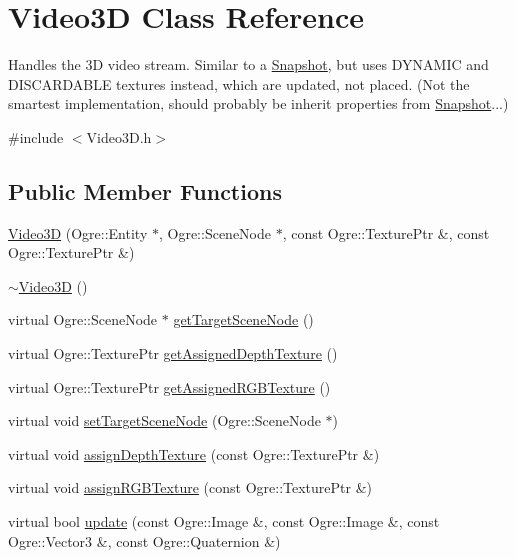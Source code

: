 \hypertarget{classVideo3D}{\section{\-Video3\-D \-Class \-Reference}
\label{classVideo3D}
}


\-Handles the 3\-D video stream. \-Similar to a \hyperlink{classSnapshot}{\-Snapshot}, but uses \-D\-Y\-N\-A\-M\-I\-C and \-D\-I\-S\-C\-A\-R\-D\-A\-B\-L\-E textures instead, which are updated, not placed. (\-Not the smartest implementation, should probably be inherit properties from \hyperlink{classSnapshot}{\-Snapshot}...)  




{\ttfamily \#include $<$\-Video3\-D.\-h$>$}

\subsection*{\-Public \-Member \-Functions}
\begin{DoxyCompactItemize}
\item 
\hyperlink{classVideo3D_aad8f80b8d60351bb34955a19c3f36d9b}{\-Video3\-D} (\-Ogre\-::\-Entity $\ast$, \-Ogre\-::\-Scene\-Node $\ast$, const \-Ogre\-::\-Texture\-Ptr \&, const \-Ogre\-::\-Texture\-Ptr \&)
\item 
\hyperlink{classVideo3D_a04f3933f882ba5f2e4fc36094e41abcf}{$\sim$\-Video3\-D} ()
\item 
virtual \-Ogre\-::\-Scene\-Node $\ast$ \hyperlink{classVideo3D_a19bafff8518433c46bb75cb9961fb8d6}{get\-Target\-Scene\-Node} ()
\item 
virtual \-Ogre\-::\-Texture\-Ptr \hyperlink{classVideo3D_aa1545fe5f983c6f9c51d43137b42b376}{get\-Assigned\-Depth\-Texture} ()
\item 
virtual \-Ogre\-::\-Texture\-Ptr \hyperlink{classVideo3D_a518e4f0e0cd61d33c55aad6a4ac17026}{get\-Assigned\-R\-G\-B\-Texture} ()
\item 
virtual void \hyperlink{classVideo3D_a1f2dc38dc3eee1286a550e97ce1685ec}{set\-Target\-Scene\-Node} (\-Ogre\-::\-Scene\-Node $\ast$)
\item 
virtual void \hyperlink{classVideo3D_a0be3f2fb99f5bba139d624077a55d640}{assign\-Depth\-Texture} (const \-Ogre\-::\-Texture\-Ptr \&)
\item 
virtual void \hyperlink{classVideo3D_a805bc17368571ce3826e98d45531cd2c}{assign\-R\-G\-B\-Texture} (const \-Ogre\-::\-Texture\-Ptr \&)
\item 
virtual bool \hyperlink{classVideo3D_a537270e52644622719f8765b86b00ec8}{update} (const \-Ogre\-::\-Image \&, const \-Ogre\-::\-Image \&, const \-Ogre\-::\-Vector3 \&, const \-Ogre\-::\-Quaternion \&)
\end{DoxyCompactItemize}
